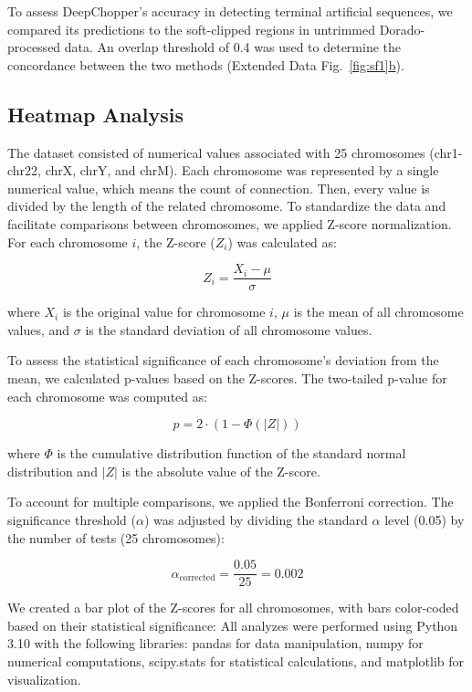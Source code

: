 \documentclass[pdflatex, sn-mathphys-num, lineno]{sn-jnl}%
\newcommand{\edfigref}[2]{Extended Data Fig.~\hyperref[#1]{\ref*{#1}#2}}
\theoremstyle{thmstyleone}%
\theoremstyle{thmstyletwo}%
\theoremstyle{thmstylethree}%
\begin{document}
To assess DeepChopper's accuracy in detecting terminal artificial sequences, we compared its predictions to the soft-clipped regions in untrimmed Dorado-processed data.
An overlap threshold of 0.4 was used to determine the concordance between the two methods (\edfigref{fig:sf1}{b}).

\subsection{Heatmap Analysis}

The dataset consisted of numerical values associated with 25 chromosomes (chr1-chr22, chrX, chrY, and chrM). 
Each chromosome was represented by a single numerical value, which means the count of connection.
Then, every value is divided by the length of the related chromosome.
To standardize the data and facilitate comparisons between chromosomes, we applied Z-score normalization. 
For each chromosome $i$, the Z-score ($Z_i$) was calculated as:

\begin{equation}
Z_i = \frac{X_i - \mu}{\sigma}
\end{equation}

where $X_i$ is the original value for chromosome $i$, $\mu$ is the mean of all chromosome values, and $\sigma$ is the standard deviation of all chromosome values.

To assess the statistical significance of each chromosome's deviation from the mean, we calculated p-values based on the Z-scores. 
The two-tailed p-value for each chromosome was computed as:

\begin{equation}
p = 2 \cdot (1 - \Phi(|Z|))
\end{equation}

where $\Phi$ is the cumulative distribution function of the standard normal distribution and $|Z|$ is the absolute value of the Z-score.

To account for multiple comparisons, we applied the Bonferroni correction. 
The significance threshold ($\alpha$) was adjusted by dividing the standard $\alpha$ level (0.05) by the number of tests (25 chromosomes):

\begin{equation}
\alpha_{\text{corrected}} = \frac{0.05}{25} = 0.002
\end{equation}

We created a bar plot of the Z-scores for all chromosomes, with bars color-coded based on their statistical significance:
All analyzes were performed using Python 3.10 with the following libraries: pandas for data manipulation, numpy for numerical computations, scipy.stats for statistical calculations, and matplotlib for visualization.
\end{document}
